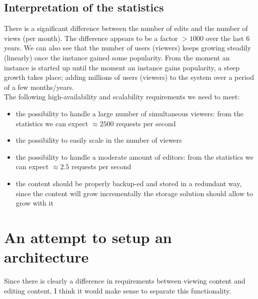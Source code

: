 \documentclass[12pt]{report}
\begin{document}
\subsection{Interpretation of the statistics}
There is a significant difference between the number of edits and the
number of views (per month).
The difference appears to be a factor $>1000$ over the last 6 years.
We can also see that the number of users (viewers) keeps growing
steadily (linearly) once the instance gained some popularity. 
From the moment an instance is started up until the moment an
instance gains popularity, a steep growth takes place; adding
millions of users (viewers) to the system over a period of a few
months/years.\\
The following high-availability and scalability requirements we need to meet:
\begin{itemize}
\item the possibility to handle a large number of
  simultaneous viewers: from the statistics we can expect $\approx 2500$
  requests per second
\item the possibility to easily scale in the number of viewers
\item the possibility to handle a moderate amount of editors: from the
  statistics we can expect $\approx 2.5$ requests per second
\item the content should be properly backup-ed and stored in a
  redundant way, since the content will grow incrementally the storage
  solution should allow to grow with it
\end{itemize}

\section{An attempt to setup an architecture}
Since there is clearly a difference in requirements between viewing content and
editing content, I think it would make sense to separate this
functionality.
\end{document}
